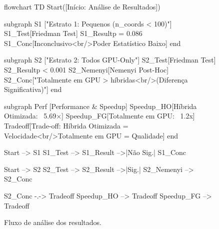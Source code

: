 \begin{figure}[htbp]
  \centering
  \begin{mermaid}
    flowchart TD
    Start([Início: Análise de Resultados])

    subgraph S1 ["Estrato 1: Pequenos (n_coords < 100)"]
    S1_Test[Friedman Test]
    S1_Result{p = 0.086}
    S1_Conc[Inconclusivo<br/>Poder Estatístico Baixo]
    end

    subgraph S2 ["Estrato 2: Todos GPU-Only"]
    S2_Test[Friedman Test]
    S2_Result{p < 0.001}
    S2_Nemenyi[Nemenyi Post-Hoc]
    S2_Conc["Totalmente em GPU > híbridas<br/>(Diferença Significativa)"]
    end

    subgraph Perf [Performance & Speedup]
    Speedup_HO[Híbrida Otimizada: ~5.69×]
    Speedup_FG[Totalmente em GPU: ~1.2x]
    Tradeoff[Trade-off: Híbrida Otimizada = Velocidade<br/>Totalmente em GPU = Qualidade]
    end

    Start --> S1
    S1_Test --> S1_Result -->|Não Sig.| S1_Conc

    Start --> S2
    S2_Test --> S2_Result -->|Sig.| S2_Nemenyi --> S2_Conc

    S2_Conc -.-> Tradeoff
    Speedup_HO --> Tradeoff
    Speedup_FG --> Tradeoff
  \end{mermaid}
  \caption{Fluxo de análise dos resultados.}
  \label{fig:results-flowchart}
\end{figure}


